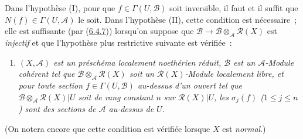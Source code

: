 \begin{env}[6.5.1]
Dans l'hypothèse (I), pour que $f\in\Gamma(U,\mathcal{B})$ soit inversible,
il faut et il suffit que $N(f)\in\Gamma(U,\mathcal{A})$ le soit. Dans
l'hypothèse (II), cette condition est nécessaire~; elle est suffisante (par
(\hyperref[II.6.4.7-fr]{6.4.7})) lorsqu'on suppose que
$\mathcal{B}\to\mathcal{B}\otimes_{\mathcal{A}}\mathcal{R}(X)$ est
\emph{injectif} et que l'hypothèse plus restrictive suivante est vérifiée~:
\begin{enumerate}
\item[(II \emph{bis})] \emph{$(X,\mathcal{A})$ est un préschéma localement
noethérien réduit, $\mathcal{B}$ est un $\mathcal{A}$-Module cohérent tel que
$\mathcal{B}\otimes_{\mathcal{A}}\mathcal{R}(X)$ soit un
$\mathcal{R}(X)$-Module localement libre, et pour toute section
$f\in\Gamma(U,\mathcal{B})$ au-dessus d'un ouvert tel que
$\mathcal{B}\otimes_{\mathcal{A}}\mathcal{R}(X)|U$ soit de rang constant $n$
sur $\mathcal{R}(X)|U$, les $\sigma_j(f)$ ($1\leq j\leq n$) sont des sections
de $\mathcal{A}$ au-dessus de $U$.}
\end{enumerate}
(On notera encore que cette condition est vérifiée lorsque $X$ est
\emph{normal}.)
\end{env}

